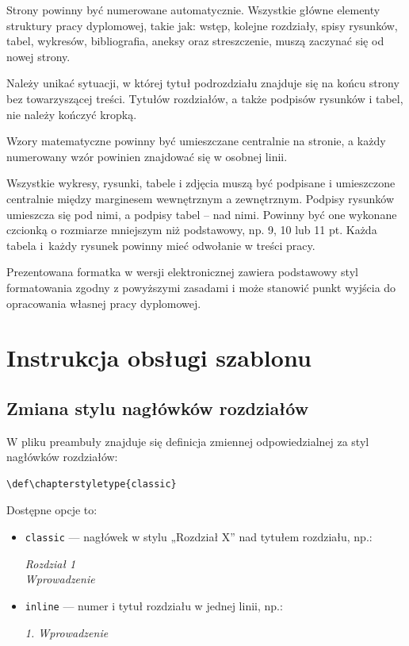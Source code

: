 \documentclass[12pt,a4paper,twoside]{report}
\def\chapterstyletype{classic}  %
\theoremstyle{definition} %
\begin{document}
Strony powinny być numerowane automatycznie. Wszystkie główne elementy struktury pracy dyplomowej, takie jak: wstęp, kolejne rozdziały, spisy rysunków, tabel, wykresów, bibliografia, aneksy oraz streszczenie, muszą zaczynać się od nowej strony.

Należy unikać sytuacji, w której tytuł podrozdziału znajduje się na końcu strony bez towarzyszącej treści. Tytułów rozdziałów, a także podpisów rysunków i tabel, nie należy kończyć kropką.

Wzory matematyczne powinny być umieszczane centralnie na stronie, a każdy numerowany wzór powinien znajdować się w osobnej linii.

Wszystkie wykresy, rysunki, tabele i zdjęcia muszą być podpisane i umieszczone centralnie między marginesem wewnętrznym a zewnętrznym. Podpisy rysunków umieszcza się pod nimi, a podpisy tabel – nad nimi. Powinny być one wykonane czcionką o rozmiarze mniejszym niż podstawowy, np. 9, 10 lub 11 pt. Każda tabela i~każdy rysunek powinny mieć odwołanie w treści pracy.

Prezentowana formatka w wersji elektronicznej zawiera podstawowy styl formatowania zgodny z powyższymi zasadami i może stanowić punkt wyjścia do opracowania własnej pracy dyplomowej.

	
    \cleardoublepage %


        \chapter{Instrukcja obsługi szablonu}

\section{Zmiana stylu nagłówków rozdziałów}

W pliku preambuły znajduje się definicja zmiennej odpowiedzialnej za styl nagłówków rozdziałów:

\begin{verbatim}
\def\chapterstyletype{classic}
\end{verbatim}

Dostępne opcje to:

\begin{itemize}
    \item \texttt{classic} — nagłówek w stylu „Rozdział X” nad tytułem rozdziału, np.:

    \medskip
    \textit{Rozdział 1} \\
    \textit{Wprowadzenie}
    
    \medskip
    \item \texttt{inline} — numer i tytuł rozdziału w jednej linii, np.:
    
    \medskip
    \textit{1. Wprowadzenie}
\end{itemize}
\end{document}
